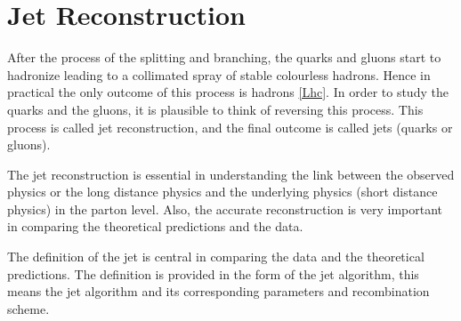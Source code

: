 \chapter{Jet Reconstruction}

After the process of the splitting and branching, the quarks and gluons start to hadronize leading to a collimated spray of stable colourless hadrons. Hence in practical the only outcome of this process is hadrons \ref{Lhc}. In order to study the quarks and the gluons, it is plausible to think of reversing this process. This process is called jet reconstruction, and the final outcome is called jets (quarks or gluons).     

The jet reconstruction is essential in understanding the link between the observed physics or the long distance physics and the underlying physics (short distance physics) in the parton level. Also, the accurate reconstruction is very important in comparing the theoretical predictions and the data. 

The definition of the jet is central in comparing the data and the theoretical predictions. The definition is provided in the form of the jet algorithm, this means the jet algorithm and its corresponding parameters and recombination scheme.






    

